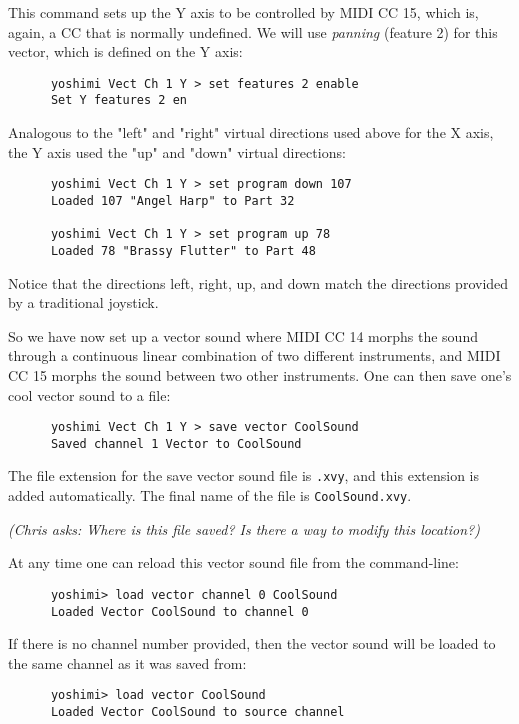    This command sets up the Y axis to be controlled by MIDI CC 15, which is,
   again, a CC that is normally undefined.
   We will use \textsl{panning} (feature 2) for this vector, which is defined
   on the Y axis:

   \begin{verbatim}
      yoshimi Vect Ch 1 Y > set features 2 enable
      Set Y features 2 en
   \end{verbatim}

   Analogous to the "left" and "right" virtual directions used above for the X
   axis, the Y axis used the "up" and "down" virtual directions:

   \begin{verbatim}
      yoshimi Vect Ch 1 Y > set program down 107
      Loaded 107 "Angel Harp" to Part 32

      yoshimi Vect Ch 1 Y > set program up 78
      Loaded 78 "Brassy Flutter" to Part 48
   \end{verbatim}

   Notice that the directions left, right, up, and down match the directions
   provided by a traditional joystick.

   So we have now set up a vector sound where MIDI CC 14 morphs the sound
   through a continuous linear combination of two different instruments,
   and MIDI CC 15 morphs the sound between two other instruments.
   One can then save one's cool vector sound to a file:

   \begin{verbatim}
      yoshimi Vect Ch 1 Y > save vector CoolSound
      Saved channel 1 Vector to CoolSound
   \end{verbatim}

   The file extension for the save vector sound file is \texttt{.xvy}, and
   this extension is added automatically.  The final name of the file is
   \texttt{CoolSound.xvy}.

   \textsl{(Chris asks:  Where is this file saved?  Is there a way to modify
   this location?)}

   At any time one can reload this vector sound file from the command-line:

   \begin{verbatim}
      yoshimi> load vector channel 0 CoolSound
      Loaded Vector CoolSound to channel 0
   \end{verbatim}

   If there is no channel number provided, then the vector sound
   will be loaded to the same channel as it was saved from:

   \begin{verbatim}
      yoshimi> load vector CoolSound
      Loaded Vector CoolSound to source channel
   \end{verbatim}

